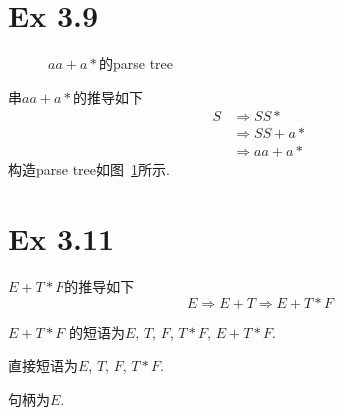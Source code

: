 \section{Ex 3.9}
\begin{solve}
  \begin{figure}[tb]
    \centering
    \caption{$aa+a*$的parse tree}
    \label{fig:aa-parse}
  \end{figure}
  串$aa+a*$的推导如下
  \begin{align*}
    S &\Rightarrow SS*\\
    &\Rightarrow SS+a*\\
    &\Rightarrow aa+a*
  \end{align*}
  构造parse tree如图~\ref{fig:aa-parse}所示.
  
\end{solve}

\section{Ex 3.11}

\begin{solve}
  $E + T * F$的推导如下
  \[E \Rightarrow E+T \Rightarrow E+T*F\]

  $E + T * F$ 的短语为$E$, $T$, $F$, $T*F$, $E+T*F$.

  直接短语为$E$, $T$, $F$, $T*F$.

  句柄为$E$.
\end{solve}

